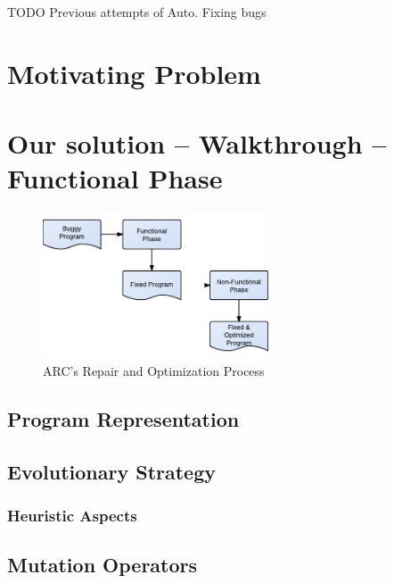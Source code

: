\documentclass[10pt, conference, compsocconf]{IEEEtran}
\begin{document}
TODO Previous attempts of Auto. Fixing bugs

\section{Motivating Problem}

\section{Our solution -- Walkthrough -- Functional Phase}

\begin{figure}[!t]
  \centering
  \includegraphics[width=6.7cm]{figures/process.pdf}
  \caption{ARC's Repair and Optimization Process}
  \label{fig:process}
  \vspace{1mm}
\end{figure}



\subsection{Program Representation}
\label{sec:programrepresentation}



\subsection{Evolutionary Strategy}
\label{sec:evolutionarystrategy}



\subsubsection{Heuristic Aspects}
\label{sec:heuristicaspects}



\subsection{Mutation Operators}
\label{sec:mutationoperators}
\end{document}

